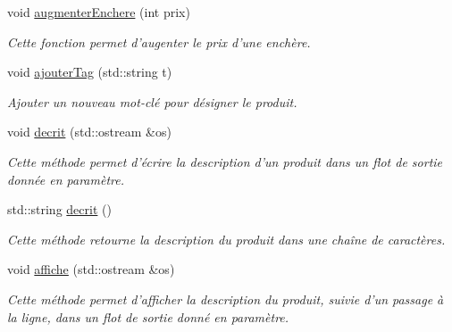 \begin{DoxyCompactItemize}
void \hyperlink{class_produit_aed251a51ae5ae9a99b991024434edcfb}{augmenter\-Enchere} (int prix)
\begin{DoxyCompactList}\small\item\em Cette fonction permet d'augenter le prix d'une enchère. \end{DoxyCompactList}\item 
void \hyperlink{class_produit_a5edb1869a3001fb320047a78ea5e715a}{ajouter\-Tag} (std\-::string t)
\begin{DoxyCompactList}\small\item\em Ajouter un nouveau mot-\/clé pour désigner le produit. \end{DoxyCompactList}\item 
void \hyperlink{class_produit_a9993d668f2200f091f8215e74060d0be}{decrit} (std\-::ostream \&os)
\begin{DoxyCompactList}\small\item\em Cette méthode permet d'écrire la description d'un produit dans un flot de sortie donnée en paramètre. \end{DoxyCompactList}\item 
std\-::string \hyperlink{class_produit_a39e7fe8ee4363f40b0397e6cf360d703}{decrit} ()
\begin{DoxyCompactList}\small\item\em Cette méthode retourne la description du produit dans une chaîne de caractères. \end{DoxyCompactList}\item 
void \hyperlink{class_produit_a1c7bbc2a601d2aa5b7e93991c18da6d1}{affiche} (std\-::ostream \&os)
\begin{DoxyCompactList}\small\item\em Cette méthode permet d'afficher la description du produit, suivie d'un passage à la ligne, dans un flot de sortie donné en paramètre. \end{DoxyCompactList}\end{DoxyCompactItemize}
